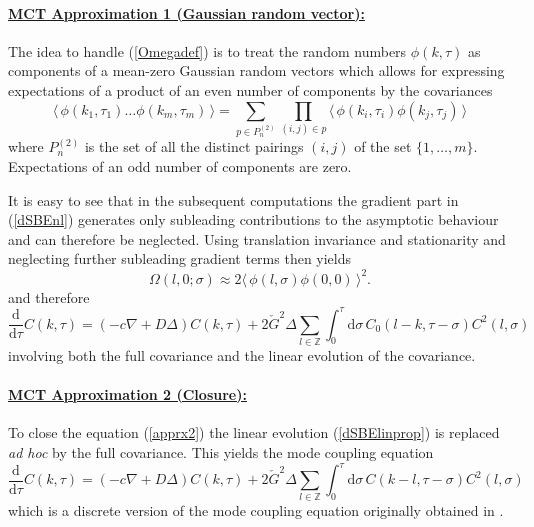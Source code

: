 \documentclass[12pt]{article}
\newcommand{\exval}[1]{\mbox{$\langle \, {#1}\, \rangle$}}
\newcommand{\rmd}{\mathrm{d}}
\newcommand{\rme}{\mathrm{e}}
\newcommand{\Z}{{\mathbb Z}}
\begin{document}
\paragraph{\underline{MCT Approximation 1 (Gaussian random vector):}}

The idea to handle (\ref{Omegadef}) is to treat the random numbers
$\phi(k,\tau)$ as components of a mean-zero Gaussian
random vectors which allows for expressing expectations of a 
product of an even number of components by the covariances
\begin{equation}
\exval{\phi(k_1,\tau_1)\dots \phi(k_m,\tau_m)} = \sum_{p \in P^{(2)}_n}
\prod_{(i,j)\in p} \exval{\phi(k_i,\tau_i)\phi(k_j,\tau_j)}
\label{Isserlis} 
\end{equation}
where $P^{(2)}_n$ is the set of all the distinct pairings $(i,j)$ 
of the set $\{1,\ldots,m\}$. Expectations of an odd number of
components are zero. 

It is easy to see that in the subsequent computations the gradient
part in (\ref{dSBEnl}) generates only subleading contributions
to the asymptotic behaviour and can therefore be neglected.
Using translation invariance and stationarity and neglecting further subleading gradient terms then yields
\begin{equation}
\Omega(l,0;\sigma) 
\approx 2 \exval{\phi(l,\sigma) \phi(0,0)}^2 .
\end{equation}
and therefore
\begin{equation}
\frac{\rmd}{\rmd \tau} C(k,\tau) 
= \left(- c \nabla + 
D \Delta\right) C(k,\tau)
+  2 \check{G}^2 \Delta \sum_{l\in\Z} \int_{0}^{\tau} \rmd \sigma \, C_0(l-k,\tau-\sigma) 
C^2(l,\sigma)
\label{apprx2}
\end{equation}
involving both the full covariance and the linear
evolution of the  covariance.

\paragraph{\underline{MCT Approximation 2 (Closure):}}

To close the equation (\ref{apprx2}) the linear evolution 
(\ref{dSBElinprop}) is replaced {\it ad hoc} by the full covariance.
This yields the mode coupling equation
\begin{equation}
\frac{\rmd}{\rmd \tau} C(k,\tau) 
= \left(- c \nabla + 
D \Delta\right) C(k,\tau)
+  2 \check{G}^2 \Delta \sum_{l\in\Z} \int_{0}^{\tau} \rmd \sigma \,  C(k-l,\tau-\sigma) 
C^2(l,\sigma) 
\label{apprx3}
\end{equation}
which is a discrete version of the mode coupling equation
originally obtained in \cite{vanB85}.
\end{document}
